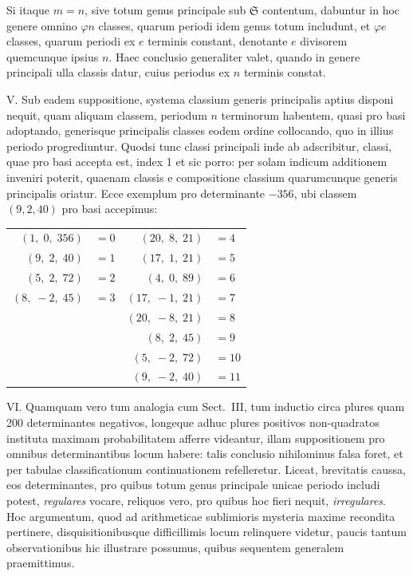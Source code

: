 \documentclass[12pt,a4paper]{article}
\theoremstyle{plain}
\theoremstyle{definition}
\theoremstyle{remark}
\begin{document}
Si itaque $m = n$, sive totum genus principale sub $\mathfrak{S}$ contentum, dabuntur in hoc genere omnino $\varphi n$ classes, quarum periodi idem genus totum includunt, et $\varphi e$ classes, quarum periodi ex $e$ terminis constant, denotante $e$ divisorem quemcunque ipsius $n$. Haec conclusio generaliter valet, quando in genere principali ulla classis datur, cuius periodus ex $n$ terminis constat.

\textsc{V.} Sub eadem suppositione, systema classium generis principalis aptius disponi nequit, quam aliquam classem, periodum $n$ terminorum habentem, quasi pro basi adoptando, generisque principalis classes eodem ordine collocando, quo in illius periodo progrediuntur. Quodsi tunc classi principali inde ab adscribitur, classi, quae pro basi accepta est, index 1 et sic porro: per solam indicum additionem inveniri poterit, quaenam classis e compositione classium quarumcunque generis principalis oriatur. Ecce exemplum pro determinante $-356$, ubi classem $(9, 2, 40)$ pro basi accepimus:

\begin{center}
\begin{tabular}{r@{\,}l@{\qquad}r@{\,}l}
$(1,\;0,\;356)$ & $= 0$ & $(20,\;8,\;21)$ & $= 4$ \\
$(9,\;2,\;40)$ & $= 1$ & $(17,\;1,\;21)$ & $= 5$ \\
$(5,\;2,\;72)$ & $= 2$ & $(4,\;0,\;89)$ & $= 6$ \\
$(8,\;-2,\;45)$ & $= 3$ & $(17,\;-1,\;21)$ & $= 7$ \\
& & $(20,\;-8,\;21)$ & $= 8$ \\
& & $(8,\;2,\;45)$ & $= 9$ \\
& & $(5,\;-2,\;72)$ & $= 10$ \\
& & $(9,\;-2,\;40)$ & $= 11$
\end{tabular}
\end{center}

\textsc{VI.} Quamquam vero tum analogia cum Sect.~III, tum inductio circa plures quam 200 determinantes negativos, longeque adhuc plures positivos non-quadratos instituta maximam probabilitatem afferre videantur, illam suppositionem pro omnibus determinantibus locum habere: talis conclusio nihilominus falsa foret, et per tabulae classificationum continuationem refelleretur. Liceat, brevitatis caussa, eos determinantes, pro quibus totum genus principale unicae periodo includi potest, \textit{regulares} vocare, reliquos vero, pro quibus hoc fieri nequit, \textit{irregulares}. Hoc argumentum, quod ad arithmeticae sublimioris mysteria maxime recondita pertinere, disquisitionibusque difficillimis locum relinquere videtur, paucis tantum observationibus hic illustrare possumus, quibus sequentem generalem praemittimus.
\end{document}
